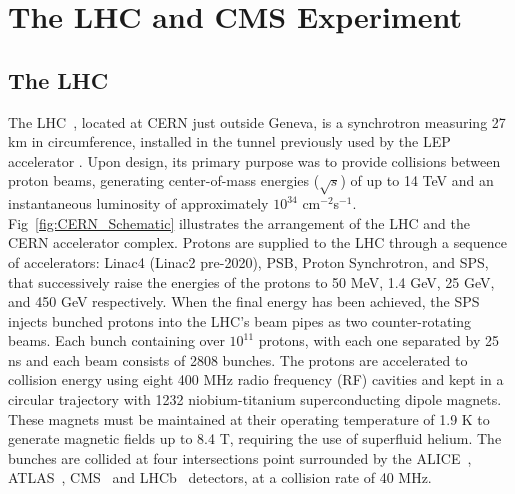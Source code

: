 \chapter{The LHC and CMS Experiment}
\label{sec:cms}

\section{The LHC}

The \ac{LHC}~\cite{Evans:2008zzb}, located at \ac{CERN} just outside Geneva, is a synchrotron measuring 27 km in circumference, installed in the tunnel previously used by the \ac{LEP} accelerator \cite{203828}. 
Upon design, its primary purpose was to provide collisions between proton beams, generating center-of-mass energies ($\sqrt{s}$) of up to 14 TeV and an instantaneous luminosity of approximately $10^{34}$ cm$^{−2}$s$^{−1}$. 
Fig~\ref{fig:CERN_Schematic} illustrates the arrangement of the LHC and the \ac{CERN} accelerator complex. 
Protons are supplied to the LHC through a sequence of accelerators: Linac4 (Linac2 pre-2020), \ac{PSB}, Proton Synchrotron, and \ac{SPS}, that successively raise the energies of the protons to 50 MeV, 1.4 GeV, 25 GeV, and 450 GeV respectively. 
When the final energy has been achieved, the \ac{SPS} injects bunched protons into the \ac{LHC}'s beam pipes as two counter-rotating beams. 
Each bunch containing over $10^11$ protons, with each one separated by 25 ns and each beam consists of 2808 bunches. 
The protons are accelerated to collision energy using eight 400 MHz radio frequency (RF) cavities and kept in a circular trajectory with 1232 niobium-titanium superconducting dipole magnets. 
These magnets must be maintained at their operating temperature of 1.9 K to generate magnetic fields up to 8.4 T, requiring the use of superfluid helium. 
The bunches are collided at four intersections point surrounded by the ALICE~\cite{ALICE:2008ngc}, ATLAS~\cite{ATLAS:2008xda}, CMS~\cite{CMS_Setup} and LHCb~\cite{LHCb:2008vvz} detectors, at a collision rate of 40 MHz. \\

